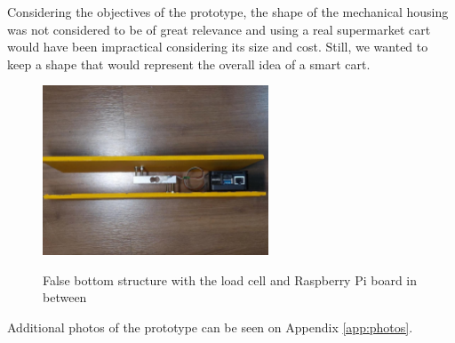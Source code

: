 Considering the objectives of the prototype, the shape of the mechanical
housing was not considered to be of great relevance and using a real
supermarket cart would have been impractical considering its size and cost. Still, we wanted
to keep a shape that would represent the overall idea of a smart cart.

\begin{figure}[H]
	\centering
	\caption[False bottom structure with the load cell and Raspberry Pi board in between]{False bottom structure with the load cell and Raspberry Pi board in between}
    \includegraphics[width=0.6\textwidth]{./images/cartbase2.jpeg}
	\fonte{}
    \label{fig:falsebottom}
\end{figure}

Additional photos of the prototype can be seen on Appendix \ref{app:photos}.

